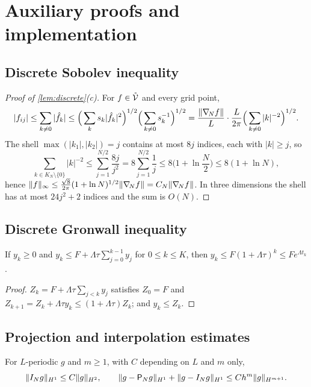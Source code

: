\appendix
\section{Auxiliary proofs and implementation}\label{app}

\subsection{Discrete Sobolev inequality}\label{app:sobolev}
\begin{proof}[Proof of \cref{lem:discrete}(c)]
For $f\in\mathring{\mathcal{V}}$ and every grid point,
\[
|f_{ij}|\le\sum_{k\ne0}|\hat f_k|\le\Big(\sum_ks_k|\hat f_k|^2\Big)^{1/2}\Big(\sum_{k\ne0}s_k^{-1}\Big)^{1/2}=\frac{\lVert \nabla_{\!N} f\rVert}{L}\cdot\frac L{2\pi}\Big(\sum_{k\ne0}|k|^{-2}\Big)^{1/2}.
\] The shell $\max(|k_1|,|k_2|)=j$ contains at most $8j$ indices, each with $|k|\ge j$, so
\[
\sum_{k\in K_N\setminus\{0\}}|k|^{-2}\le\sum_{j=1}^{N/2}\frac{8j}{j^2}=8\sum_{j=1}^{N/2}\frac1j\le8\Big(1+\ln\frac N2\Big)\le8(1+\ln N),
\]
hence $\lVert f\rVert_\infty\le\frac{\sqrt8}{2\pi}(1+\ln N)^{1/2}\lVert \nabla_{\!N} f\rVert=C_N\lVert \nabla_{\!N} f\rVert$. In three dimensions the shell has at most $24j^2+2$ indices and the sum is $O(N)$.
\end{proof}

\subsection{Discrete Gronwall inequality}
\begin{lemma}\label{lem:gronwall}
If $y_k\ge0$ and $y_k\le F+\Lambda\tau\sum_{j=0}^{k-1}y_j$ for $0\le k\le K$, then $y_k\le F(1+\Lambda\tau)^k\le Fe^{\Lambda t_k}$.
\end{lemma}

\begin{proof}
$Z_k=F+\Lambda\tau\sum_{j<k}y_j$ satisfies $Z_0=F$ and $Z_{k+1}=Z_k+\Lambda\tau y_k\le(1+\Lambda\tau)Z_k$; and $y_k\le Z_k$.
\end{proof}

\subsection{Projection and interpolation estimates}\label{app:interp}
\begin{lemma}\label{lem:interp}
For $L$-periodic $g$ and $m\ge1$, with $C$ depending on $L$ and $m$ only,
\[
\lVert I_Ng\rVert_{H^1}\le C\lVert g\rVert_{H^2},\qquad \lVert g-\mathsf P_Ng\rVert_{H^1}+\lVert g-I_Ng\rVert_{H^1}\le Ch^m\lVert g\rVert_{H^{m+1}} .
\]
\end{lemma}

